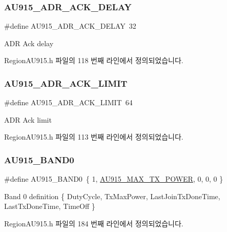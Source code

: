 \subsubsection{\texorpdfstring{A\+U915\+\_\+\+A\+D\+R\+\_\+\+A\+C\+K\+\_\+\+D\+E\+L\+AY}{AU915\_ADR\_ACK\_DELAY}}
{\footnotesize\ttfamily \#define A\+U915\+\_\+\+A\+D\+R\+\_\+\+A\+C\+K\+\_\+\+D\+E\+L\+AY~32}

A\+DR Ack delay 

Region\+A\+U915.\+h 파일의 118 번째 라인에서 정의되었습니다.

\mbox{\label{group___r_e_g_i_o_n_a_u915_gab5782862067a1d6338da8372a9d484c6}} 
\subsubsection{\texorpdfstring{A\+U915\+\_\+\+A\+D\+R\+\_\+\+A\+C\+K\+\_\+\+L\+I\+M\+IT}{AU915\_ADR\_ACK\_LIMIT}}
{\footnotesize\ttfamily \#define A\+U915\+\_\+\+A\+D\+R\+\_\+\+A\+C\+K\+\_\+\+L\+I\+M\+IT~64}

A\+DR Ack limit 

Region\+A\+U915.\+h 파일의 113 번째 라인에서 정의되었습니다.

\mbox{\label{group___r_e_g_i_o_n_a_u915_ga6e0a29afe59acad8c0b01808e984684a}} 
\subsubsection{\texorpdfstring{A\+U915\+\_\+\+B\+A\+N\+D0}{AU915\_BAND0}}
{\footnotesize\ttfamily \#define A\+U915\+\_\+\+B\+A\+N\+D0~\{ 1, \mbox{\hyperlink{group___r_e_g_i_o_n_a_u915_ga36808f695e52582b8a6a3ca4b4bf61d4}{A\+U915\+\_\+\+M\+A\+X\+\_\+\+T\+X\+\_\+\+P\+O\+W\+ER}}, 0, 0, 0 \}}

Band 0 definition \{ Duty\+Cycle, Tx\+Max\+Power, Last\+Join\+Tx\+Done\+Time, Last\+Tx\+Done\+Time, Time\+Off \} 

Region\+A\+U915.\+h 파일의 184 번째 라인에서 정의되었습니다.

